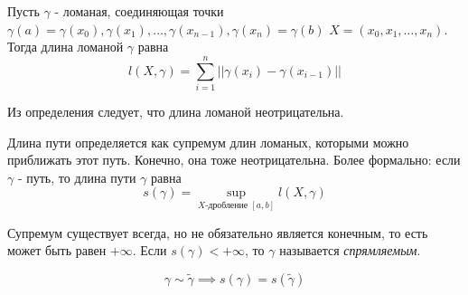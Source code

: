 \documentclass[../main.tex]{subfiles}
\begin{document}
Пусть \( \gamma \) - ломаная, соединяющая точки \( \gamma \left( a\right)= \gamma \left( x_0\right), \gamma \left( x_1\right), \dots,  \gamma \left( x_{n-1}\right), \gamma \left( x_n\right)= \gamma \left( b\right)\)
\(  X=\left( x_0,x_1, \dots,x_n\right)\). Тогда длина ломаной \( \gamma \) равна 
\[ l \left(X, \gamma \right) = \sum\limits_{ i=1}^{ n} \left| \left| \gamma \left( x_i\right)- \gamma \left( x_{i-1}\right)\right|\right|\] 

Из определения следует, что длина ломаной неотрицательна. 


Длина пути определяется как супремум длин ломаных, которыми можно приближать этот путь. Конечно, она тоже неотрицательна. Более формально: если \( \gamma \) - путь, то длина пути \( \gamma \) равна 
\[ s\left(\gamma \right)= \sup\limits_{ X\text{-дробление }\left[ a,b\right]} l \left( X, \gamma \right)\]

Супремум существует всегда, но не обязательно является конечным, то есть может быть равен \( + \infty \). Если \( s\left( \gamma \right)<+ \infty \), то \( \gamma \) называется \emph{\hypertarget{def:straight}{спрямляемым}}.  

\begin{thm}
    \[ \gamma \sim \tilde{ \gamma } \implies s\left( \gamma \right)=s\left( \tilde{ \gamma }\right)\]
\end{thm}
\end{document}

